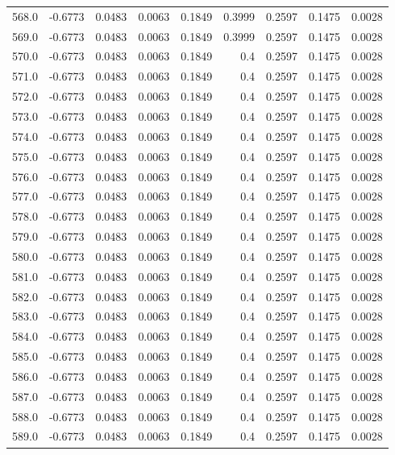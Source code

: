 \begin{longtable}{lrrrrrrrr}
568.0 & -0.6773 & 0.0483 & 0.0063 & 0.1849 & 0.3999 & 0.2597 & 0.1475 & 0.0028 \\
569.0 & -0.6773 & 0.0483 & 0.0063 & 0.1849 & 0.3999 & 0.2597 & 0.1475 & 0.0028 \\
570.0 & -0.6773 & 0.0483 & 0.0063 & 0.1849 & 0.4 & 0.2597 & 0.1475 & 0.0028 \\
571.0 & -0.6773 & 0.0483 & 0.0063 & 0.1849 & 0.4 & 0.2597 & 0.1475 & 0.0028 \\
572.0 & -0.6773 & 0.0483 & 0.0063 & 0.1849 & 0.4 & 0.2597 & 0.1475 & 0.0028 \\
573.0 & -0.6773 & 0.0483 & 0.0063 & 0.1849 & 0.4 & 0.2597 & 0.1475 & 0.0028 \\
574.0 & -0.6773 & 0.0483 & 0.0063 & 0.1849 & 0.4 & 0.2597 & 0.1475 & 0.0028 \\
575.0 & -0.6773 & 0.0483 & 0.0063 & 0.1849 & 0.4 & 0.2597 & 0.1475 & 0.0028 \\
576.0 & -0.6773 & 0.0483 & 0.0063 & 0.1849 & 0.4 & 0.2597 & 0.1475 & 0.0028 \\
577.0 & -0.6773 & 0.0483 & 0.0063 & 0.1849 & 0.4 & 0.2597 & 0.1475 & 0.0028 \\
578.0 & -0.6773 & 0.0483 & 0.0063 & 0.1849 & 0.4 & 0.2597 & 0.1475 & 0.0028 \\
579.0 & -0.6773 & 0.0483 & 0.0063 & 0.1849 & 0.4 & 0.2597 & 0.1475 & 0.0028 \\
580.0 & -0.6773 & 0.0483 & 0.0063 & 0.1849 & 0.4 & 0.2597 & 0.1475 & 0.0028 \\
581.0 & -0.6773 & 0.0483 & 0.0063 & 0.1849 & 0.4 & 0.2597 & 0.1475 & 0.0028 \\
582.0 & -0.6773 & 0.0483 & 0.0063 & 0.1849 & 0.4 & 0.2597 & 0.1475 & 0.0028 \\
583.0 & -0.6773 & 0.0483 & 0.0063 & 0.1849 & 0.4 & 0.2597 & 0.1475 & 0.0028 \\
584.0 & -0.6773 & 0.0483 & 0.0063 & 0.1849 & 0.4 & 0.2597 & 0.1475 & 0.0028 \\
585.0 & -0.6773 & 0.0483 & 0.0063 & 0.1849 & 0.4 & 0.2597 & 0.1475 & 0.0028 \\
586.0 & -0.6773 & 0.0483 & 0.0063 & 0.1849 & 0.4 & 0.2597 & 0.1475 & 0.0028 \\
587.0 & -0.6773 & 0.0483 & 0.0063 & 0.1849 & 0.4 & 0.2597 & 0.1475 & 0.0028 \\
588.0 & -0.6773 & 0.0483 & 0.0063 & 0.1849 & 0.4 & 0.2597 & 0.1475 & 0.0028 \\
589.0 & -0.6773 & 0.0483 & 0.0063 & 0.1849 & 0.4 & 0.2597 & 0.1475 & 0.0028 \\

\end{longtable}

